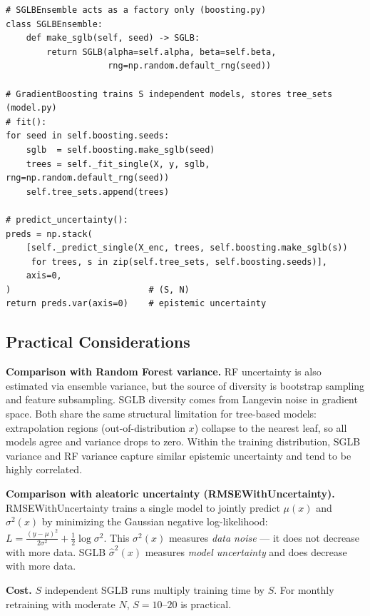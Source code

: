 \documentclass[11pt, a4paper]{article}
\begin{document}
\begin{listing}[H]
\caption{Epistemic uncertainty via ensemble (\texttt{model.py})}
\begin{verbatim}
# SGLBEnsemble acts as a factory only (boosting.py)
class SGLBEnsemble:
    def make_sglb(self, seed) -> SGLB:
        return SGLB(alpha=self.alpha, beta=self.beta,
                    rng=np.random.default_rng(seed))

# GradientBoosting trains S independent models, stores tree_sets (model.py)
# fit():
for seed in self.boosting.seeds:
    sglb  = self.boosting.make_sglb(seed)
    trees = self._fit_single(X, y, sglb, rng=np.random.default_rng(seed))
    self.tree_sets.append(trees)

# predict_uncertainty():
preds = np.stack(
    [self._predict_single(X_enc, trees, self.boosting.make_sglb(s))
     for trees, s in zip(self.tree_sets, self.boosting.seeds)],
    axis=0,
)                           # (S, N)
return preds.var(axis=0)    # epistemic uncertainty
\end{verbatim}
\end{listing}

\subsection{Practical Considerations}

\textbf{Comparison with Random Forest variance.}
RF uncertainty is also estimated via ensemble variance, but the source
of diversity is bootstrap sampling and feature subsampling.
SGLB diversity comes from Langevin noise in gradient space.
Both share the same structural limitation for tree-based models:
extrapolation regions (out-of-distribution $x$) collapse to the nearest
leaf, so all models agree and variance drops to zero.
Within the training distribution, SGLB variance and RF variance capture
similar epistemic uncertainty and tend to be highly correlated.

\textbf{Comparison with aleatoric uncertainty (RMSEWithUncertainty).}
RMSEWithUncertainty trains a single model to jointly predict $\mu(x)$
and $\sigma^2(x)$ by minimizing the Gaussian negative log-likelihood:
$L = \frac{(y-\mu)^2}{2\sigma^2} + \frac{1}{2}\log\sigma^2$.
This $\sigma^2(x)$ measures \emph{data noise} --- it does not decrease
with more data. SGLB $\hat{\sigma}^2(x)$ measures \emph{model uncertainty}
and does decrease with more data.

\textbf{Cost.} $S$ independent SGLB runs multiply training time by $S$.
For monthly retraining with moderate $N$, $S = 10$--$20$ is practical.
\end{document}
